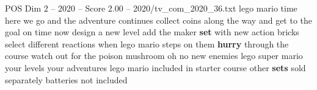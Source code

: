 \begin{textsample}{POS Dim 2 – 2020 – Score 2.00 – 2020/tv\_com\_2020\_36.txt}  \label{ex:f2_pos_073}
lego mario time here we go and the adventure continues collect coins along the way and get to the goal on time now design a new level add the maker \textbf{set} with new action bricks select different reactions when lego mario steps on them \textbf{hurry} through the course watch out for the poison mushroom oh no new enemies lego super mario your levels your adventures lego mario included in starter course other \textbf{sets} sold separately batteries not included

\end{textsample}
